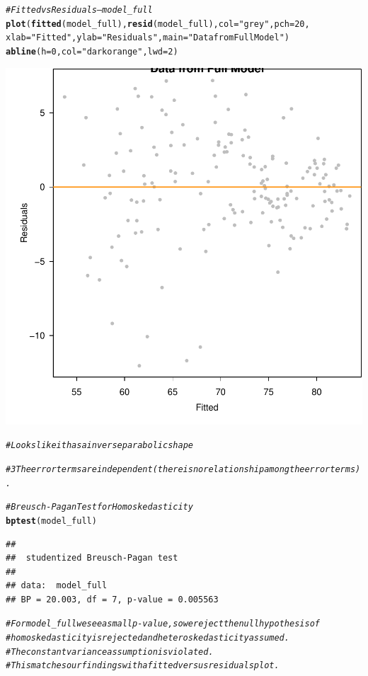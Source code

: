 \documentclass{article}\usepackage[]{graphicx}\usepackage[]{color}
\makeatletter
\newcommand{\hlnum}[1]{\textcolor[rgb]{0.686,0.059,0.569}{#1}}%
\newcommand{\hlstr}[1]{\textcolor[rgb]{0.192,0.494,0.8}{#1}}%
\newcommand{\hlcom}[1]{\textcolor[rgb]{0.678,0.584,0.686}{\textit{#1}}}%
\newcommand{\hlstd}[1]{\textcolor[rgb]{0.345,0.345,0.345}{#1}}%
\newcommand{\hlkwc}[1]{\textcolor[rgb]{0.333,0.667,0.333}{#1}}%
\newcommand{\hlkwd}[1]{\textcolor[rgb]{0.737,0.353,0.396}{\textbf{#1}}}%
\newenvironment{kframe}{%
 \def\at@end@of@kframe{}%
 \ifinner\ifhmode%
  \def\at@end@of@kframe{\end{minipage}}%
  \begin{minipage}{\columnwidth}%
 \fi\fi%
 \def\FrameCommand##1{\hskip\@totalleftmargin \hskip-\fboxsep
 \colorbox{shadecolor}{##1}\hskip-\fboxsep
     \hskip-\linewidth \hskip-\@totalleftmargin \hskip\columnwidth}%
 \MakeFramed {\advance\hsize-\width
   \@totalleftmargin\z@ \linewidth\hsize
   \@setminipage}}%
 {\par\unskip\endMakeFramed%
 \at@end@of@kframe}
\newenvironment{knitrout}{}{} %
\makeatother
\begin{document}
\begin{knitrout}
\begin{kframe}
\begin{alltt}
\hlcom{# Fitted vs Residuals --- model_full}
\hlkwd{plot}\hlstd{(}\hlkwd{fitted}\hlstd{(model_full),} \hlkwd{resid}\hlstd{(model_full),} \hlkwc{col} \hlstd{=} \hlstr{"grey"}\hlstd{,} \hlkwc{pch} \hlstd{=} \hlnum{20}\hlstd{,}
     \hlkwc{xlab} \hlstd{=} \hlstr{"Fitted"}\hlstd{,} \hlkwc{ylab} \hlstd{=} \hlstr{"Residuals"}\hlstd{,} \hlkwc{main} \hlstd{=} \hlstr{"Data from Full Model"}\hlstd{)}
\hlkwd{abline}\hlstd{(}\hlkwc{h} \hlstd{=} \hlnum{0}\hlstd{,} \hlkwc{col} \hlstd{=} \hlstr{"darkorange"}\hlstd{,} \hlkwc{lwd} \hlstd{=} \hlnum{2}\hlstd{)}
\end{alltt}
\end{kframe}

{\centering \includegraphics[width=.6\linewidth]{figure/Analysis-Rnwauto-report-20} 

}


\begin{kframe}\begin{alltt}
\hlcom{# Looks like it has a inverse parabolic shape}


\hlcom{# 3 The error terms are independent (there is no relationship among the error terms).}

\hlcom{# Breusch-Pagan Test for Homoskedasticity}
\hlkwd{bptest}\hlstd{(model_full)}
\end{alltt}
\begin{verbatim}
## 
## 	studentized Breusch-Pagan test
## 
## data:  model_full
## BP = 20.003, df = 7, p-value = 0.005563
\end{verbatim}
\begin{alltt}
\hlcom{# For model_full we see a small p-value, so we reject the null hypothesis of }
\hlcom{#     homoskedasticity is rejected and heteroskedasticity assumed.}
\hlcom{# The constant variance assumption is violated. }
\hlcom{# This matches our findings with a fitted versus residuals plot.}


\end{alltt}
\end{kframe}
\end{knitrout}
\end{document}
